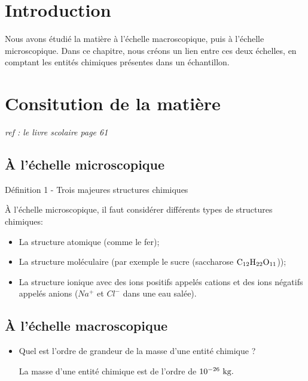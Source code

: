 \documentclass[french, a4paper, 12pt, landscape, twocolumn]{article}
\begin{document}

\section*{Introduction}

Nous avons étudié la matière à l’échelle macroscopique, puis à l’échelle microscopique.
Dans ce chapitre, nous créons un lien entre ces deux échelles, en comptant
les entités chimiques présentes dans un échantillon.

\section{Consitution de la matière}
\begin{center}
	\textit{ref : le livre scolaire page 61}
\end{center}

\subsection{À l'échelle microscopique}


\begin{definition}{Définition 1 - Trois majeures structures chimiques}

	À l'échelle microscopique, il faut considérer différents types de structures chimiques: 
	\begin{itemize}
		\item  La structure atomique (comme le fer);
		\item  La structure moléculaire (par exemple le sucre (saccharose $\rm C_{12}H_{22}O_{11}$));
		\item  La structure ionique avec des ions positifs appelés cations et des ions négatifs appelés anions ($Na^+$ et $Cl^-$ dans une eau salée).
	\end{itemize}	
\end{definition}

\subsection{À l'échelle macroscopique}

\begin{itemize}
	\item Quel est l'ordre de grandeur de la masse d'une entité chimique ? \medskip

		La masse d'une entité chimique est de l'ordre de $10^{-26}~\rm kg.$
\end{itemize}
\end{document}
